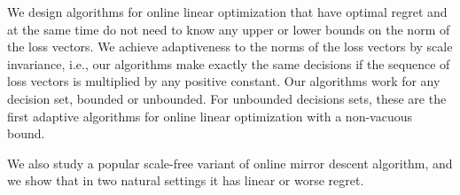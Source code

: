We design algorithms for online linear optimization that have optimal regret
and at the same time do not need to know any upper or lower bounds on the norm
of the loss vectors.  We achieve adaptiveness to the norms of the loss vectors by scale
invariance, i.e., our algorithms make exactly the same decisions if the
sequence of loss vectors is multiplied by any positive constant.  Our
algorithms work for any decision set, bounded or unbounded.  For unbounded
decisions sets, these are the first adaptive algorithms for online linear
optimization with a non-vacuous bound.

We also study a popular scale-free variant of online mirror descent algorithm,
and we show that in two natural settings it has linear or worse regret.
